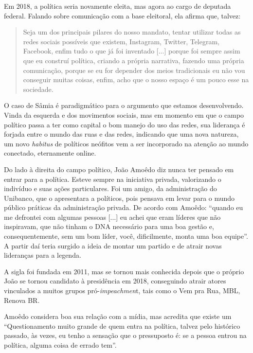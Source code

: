 Em 2018, a política seria novamente eleita, mas agora ao cargo de
deputada federal. Falando sobre comunicação com a base eleitoral, ela
afirma que, talvez:

\begin{quote}
Seja um dos principais pilares do nosso mandato, tentar utilizar todas
as redes sociais possíveis que existem, Instagram, Twitter, Telegram,
Facebook, enfim tudo o que já foi inventado {[}...{]} porque foi sempre
assim que eu construí política, criando a própria narrativa, fazendo uma
própria comunicação, porque se eu for depender dos meios tradicionais eu
não vou conseguir muitas coisas, enfim, acho que o nosso espaço é um
pouco esse na sociedade.
\end{quote}

O caso de Sâmia é paradigmático para o argumento que estamos
desenvolvendo. Vinda da esquerda e dos movimentos sociais, mas em
momento em que o campo político passa a ter como capital o bom manejo do
uso das redes, sua liderança é forjada entre o mundo das ruas e das
redes, indicando que uma nova natureza, um novo \emph{habitus} de
políticos neófitos vem a ser incorporado na atenção ao mundo conectado,
eternamente online.

Do lado à direita do campo político, João Amoêdo diz nunca ter pensado
em entrar para a política. Esteve sempre na iniciativa privada,
valorizando o indivíduo e suas ações particulares. Foi um amigo, da
administração do Unibanco, que o apresentara a políticos, pois pensava
em levar para o mundo público práticas da administração privada. De
acordo com Amoêdo: ``quando eu me defrontei com algumas pessoas
{[}...{]} eu achei que eram líderes que não inspiravam, que não tinham o
DNA necessário para uma boa gestão e, consequentemente, sem um bom
líder, você, dificilmente, monta uma boa equipe''. A partir daí teria
surgido a ideia de montar um partido e de atrair novas lideranças para a
legenda.

A sigla foi fundada em 2011, mas se tornou mais conhecida depois que o
próprio João se tornou candidato à presidência em 2018, conseguindo
atrair atores vinculados a muitos grupos pró-\emph{impeachmen}t, tais
como o Vem pra Rua, MBL, Renova BR.

Amoêdo considera boa sua relação com a mídia, mas acredita que existe um
``Questionamento muito grande de quem entra na política, talvez pelo
histórico passado, às vezes, eu tenho a sensação que o pressuposto é: se
a pessoa entrou na política, alguma coisa de errado tem''.

